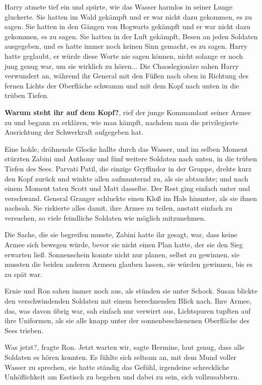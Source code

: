 Harry atmete tief ein und spürte, wie das Wasser harmlos in seiner Lunge
gluckerte. Sie hatten im Wald gekämpft und er war nicht dazu gekommen, es zu
sagen. Sie hatten in den Gängen von Hogwarts gekämpft und er war nicht dazu
gekommen, es zu sagen. Sie hatten in der Luft gekämpft, Besen an jeden Soldaten
ausgegeben, und es hatte immer noch keinen Sinn gemacht, es zu sagen. Harry
hatte geglaubt, er würde diese Worte nie sagen können, nicht solange er noch
jung genug war, um sie wirklich zu hören... Die Chaoslegionäre sahen Harry
verwundert an, während ihr General mit den Füßen nach oben in Richtung des
fernen Lichts der Oberfläche schwamm und mit dem Kopf nach unten in die trüben
Tiefen.

\glqq{}\textbf{Warum steht ihr auf dem Kopf?}\grqq{}, rief der junge Kommandant
seiner Armee zu und begann zu erklären, wie man kämpft, nachdem man die
privilegierte Ausrichtung der Schwerkraft aufgegeben hat.

Eine hohle, dröhnende Glocke hallte durch das Wasser, und im selben Moment
stürzten Zabini und Anthony und fünf weitere Soldaten nach unten, in die trüben
Tiefen des Sees. Parvati Patil, die einzige Gryffindor in der Gruppe, drehte
kurz den Kopf zurück und winkte allen aufmunternd zu, als sie abtauchte; und
nach einem Moment taten Scott und Matt dasselbe. Der Rest ging einfach unter und
verschwand. General Granger schluckte einen Kloß im Hals hinunter, als sie ihnen
nachsah. Sie riskierte alles damit, ihre Armee zu teilen, anstatt einfach zu
versuchen, so viele feindliche Soldaten wie möglich mitzunehmen.

Die Sache, die sie begreifen musste, Zabini hatte ihr gesagt, war, dass keine
Armee sich bewegen würde, bevor sie nicht einen Plan hatte, der sie den Sieg
erwarten ließ. Sonnenschein konnte nicht nur planen, selbst zu gewinnen, sie
mussten die beiden anderen Armeen glauben lassen, sie würden gewinnen, bis es zu
spät war.

Ernie und Ron sahen immer noch aus, als stünden sie unter Schock. Susan blickte
den verschwindenden Soldaten mit einem berechnenden Blick nach. Ihre Armee, das,
was davon übrig war, sah einfach nur verwirrt aus, Lichtspuren tupften auf ihre
Uniformen, als sie alle knapp unter der sonnenbeschienenen Oberfläche des Sees
trieben.

\glqq{}Was jetzt?\grqq{}, fragte Ron. \glqq{}Jetzt warten wir\grqq{}, sagte
Hermine, laut genug, dass alle Soldaten es hören konnten. Es fühlte sich seltsam
an, mit dem Mund voller Wasser zu sprechen, sie hatte ständig das Gefühl,
irgendeine schreckliche Unhöflichkeit am Esstisch zu begehen und dabei zu sein,
sich vollzusabbern.


